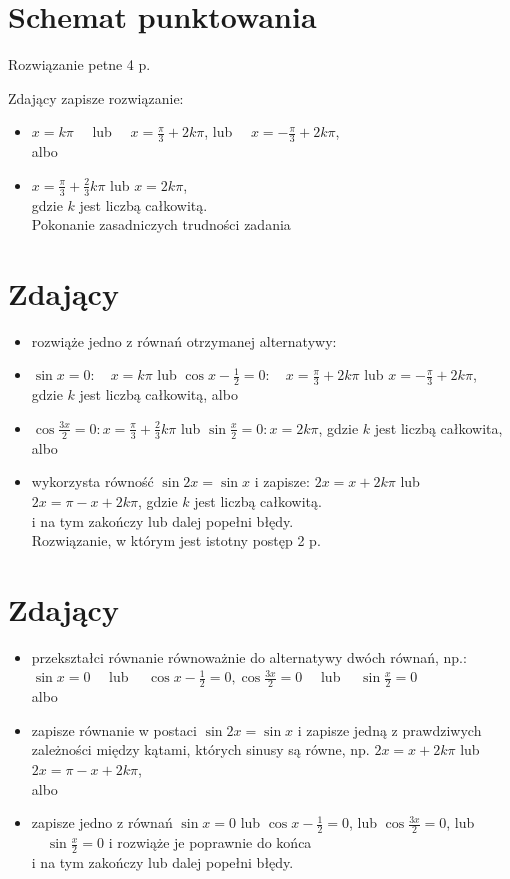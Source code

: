 \documentclass[10pt]{article}
\begin{document}
\section*{Schemat punktowania}
Rozwiązanie petne 4 p.

Zdający zapisze rozwiązanie:

\begin{itemize}
  \item $x=k \pi \quad$ lub $\quad x=\frac{\pi}{3}+2 k \pi$, lub $\quad x=-\frac{\pi}{3}+2 k \pi$,\\
albo
  \item $x=\frac{\pi}{3}+\frac{2}{3} k \pi$ lub $x=2 k \pi$,\\
gdzie $k$ jest liczbą całkowitą.\\
Pokonanie zasadniczych trudności zadania
\end{itemize}

\section*{Zdający}
\begin{itemize}
  \item rozwiąże jedno z równań otrzymanej alternatywy:
  \item $\sin x=0: \quad x=k \pi$ lub $\cos x-\frac{1}{2}=0: \quad x=\frac{\pi}{3}+2 k \pi$ lub $x=-\frac{\pi}{3}+2 k \pi$, gdzie $k$ jest liczbą całkowitą, albo
  \item $\cos \frac{3 x}{2}=0: x=\frac{\pi}{3}+\frac{2}{3} k \pi$ lub $\sin \frac{x}{2}=0: x=2 k \pi$, gdzie $k$ jest liczbą całkowita,\\
albo
  \item wykorzysta równość $\sin 2 x=\sin x$ i zapisze: $2 x=x+2 k \pi$ lub $2 x=\pi-x+2 k \pi$, gdzie $k$ jest liczbą całkowitą.\\
i na tym zakończy lub dalej popełni błędy.\\
Rozwiązanie, w którym jest istotny postęp 2 p.
\end{itemize}

\section*{Zdający}
\begin{itemize}
  \item przekształci równanie równoważnie do alternatywy dwóch równań, np.: $\sin x=0 \quad$ lub $\quad \cos x-\frac{1}{2}=0, \cos \frac{3 x}{2}=0 \quad$ lub $\quad \sin \frac{x}{2}=0$\\
albo
  \item zapisze równanie w postaci $\sin 2 x=\sin x$ i zapisze jedną z prawdziwych zależności między kątami, których sinusy są równe, np. $2 x=x+2 k \pi$ lub $2 x=\pi-x+2 k \pi$,\\
albo
  \item zapisze jedno z równań $\sin x=0$ lub $\cos x-\frac{1}{2}=0$, lub $\cos \frac{3 x}{2}=0$, lub $\quad \sin \frac{x}{2}=0$ i rozwiąże je poprawnie do końca\\
i na tym zakończy lub dalej popełni błędy.
\end{itemize}
\end{document}
